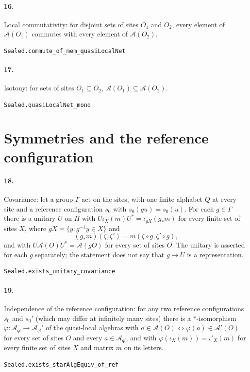 \documentclass[11pt]{article}
\begin{document}
\paragraph{16.} Local commutativity: for disjoint sets of sites $O_1$ and $O_2$, every element of $\mathcal A(O_1)$ commutes with every element of $\mathcal A(O_2)$.\par{\footnotesize\texttt{Sealed.commute\_of\_mem\_quasiLocalNet}}

\paragraph{17.} Isotony: for sets of sites $O_1 \subseteq O_2$, $\mathcal A(O_1) \subseteq \mathcal A(O_2)$.\par{\footnotesize\texttt{Sealed.quasiLocalNet\_mono}}

\section*{Symmetries and the reference configuration}
\paragraph{18.} Covariance: let a group $\Gamma$ act on the sites, with one finite alphabet $Q$ at every site and a reference configuration $s_0$ with $s_0(gu) = s_0(u)$. For each $g \in \Gamma$ there is a unitary $U$ on $H$ with $U \iota_X(m) U^* = \iota_{gX}(g_* m)$ for every finite set of sites $X$, where $gX = \{y : g^{-1} y \in X\}$ and \[(g_* m)(\zeta, \zeta') = m(\zeta \circ g, \zeta' \circ g),\] and with $U \mathcal A(O) U^* = \mathcal A(gO)$ for every set of sites $O$. The unitary is asserted for each $g$ separately; the statement does not say that $g \mapsto U$ is a representation.\par{\footnotesize\texttt{Sealed.exists\_unitary\_covariance}}

\paragraph{19.} Independence of the reference configuration: for any two reference configurations $s_0$ and $s_0'$ (which may differ at infinitely many sites) there is a $*$-isomorphism $\varphi : \mathcal A_{ql} \to \mathcal A_{ql}'$ of the quasi-local algebras with $a \in \mathcal A(O) \iff \varphi(a) \in \mathcal A'(O)$ for every set of sites $O$ and every $a \in \mathcal A_{ql}$, and with $\varphi(\iota_X(m)) = \iota'_X(m)$ for every finite set of sites $X$ and matrix $m$ on its letters.\par{\footnotesize\texttt{Sealed.exists\_starAlgEquiv\_of\_ref}}
\end{document}
